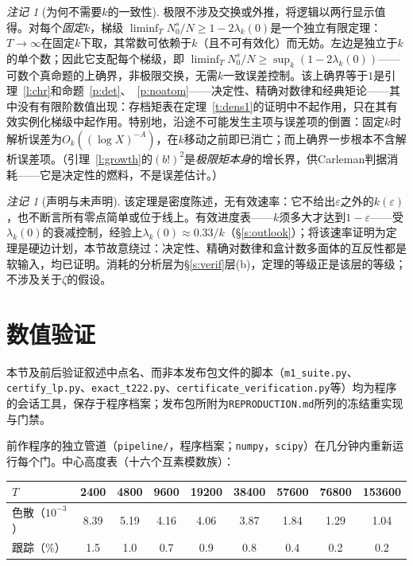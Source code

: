 \documentclass[11pt]{article}
\numberwithin{equation}{section}
\theoremstyle{definition}
\theoremstyle{remark}
\newtheorem{remark}[theorem]{注记}
\begin{document}
\begin{remark}[为何不需要$k$的一致性]\label{r:nounif}
极限不涉及交换或外推，将逻辑以两行显示值得。对每个\emph{固定}$k$，梯级
$\liminf_T N_0^{s}/N\ge1-2\lambda_k(0)$是一个独立有限定理：$T\to\infty$在固定$k$下取，其常数可依赖于$k$（且不可有效化）而无妨。左边是独立于$k$的单个数；因此它支配每个梯级，即
$\liminf_T N_0^{s}/N\ge\sup_k(1-2\lambda_k(0))$——可数个真命题的上确界，非极限交换，无需$k$一致误差控制。该上确界等于$1$是引理~\ref{l:chr}和命题~\ref{p:det}、~\ref{p:noatom}——决定性、精确对数律和经典矩论——其中没有有限阶数值出现：存档矩表在定理~\ref{t:dens1}的证明中不起作用，只在其有效实例化梯级中起作用。特别地，沿途不可能发生主项与误差项的倒置：固定$k$时解析误差为$O_k((\log X)^{-A})$，在$k$移动之前即已消亡；而上确界一步根本不含解析误差项。（引理~\ref{l:growth}的$(b!)^{2}$是\emph{极限矩本身}的增长界，供Carleman判据消耗——它是决定性的燃料，不是误差估计。）
\end{remark}

\begin{remark}[声明与未声明]\label{r:dens}
该定理是密度陈述，无有效速率：它不给出$\varepsilon$之外的$k(\varepsilon)$，也不断言所有零点简单或位于线上。有效进度表——$k$须多大才达到$1-\varepsilon$——受$\lambda_k(0)$的衰减控制，经验上$\lambda_k(0)\approx0.33/k$（\S\ref{s:outlook}）；将该速率证明为定理是硬边计划，本节故意绕过：决定性、精确对数律和盒计数多面体的互反性都是软输入，均已证明。消耗的分析层为\S\ref{s:verif}层(b)，定理的等级正是该层的等级；不涉及关于$\zeta$的假设。
\end{remark}

\section{数值验证}\label{s:faces}

本节及前后验证叙述中点名、而非本发布包文件的脚本（\texttt{m1\_suite.py}、\texttt{certify\_lp.py}、\texttt{exact\_t222.py}、\texttt{certificate\_verification.py}等）均为程序的会话工具，保存于程序档案；发布包所附为\texttt{REPRODUCTION.md}所列的冻结重实现与门禁。

前作程序的独立管道（\texttt{pipeline/}，程序档案；\texttt{numpy}，\texttt{scipy}）在几分钟内重新运行每个门。中心高度表（十六个互素模数族）：

\begin{center}
\begin{tabular}{lcccccccc}
$T$ & 2400 & 4800 & 9600 & 19200 & 38400 & 57600 & 76800 & 153600\\
\hline
色散（$10^{-3}$） & 8.39 & 5.19 & 4.16 & 4.06 & 3.87 & 1.84 & 1.29 & 1.04\\
跟踪（\%） & 1.5 & 1.0 & 0.7 & 0.9 & 0.8 & 0.4 & 0.2 & 0.2\\
\end{tabular}
\end{center}
\end{document}
